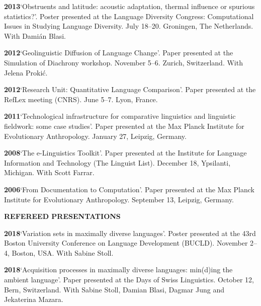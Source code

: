 \documentclass[11pt]{article}
\newcommand{\hangpara}{
 \setlength{\parindent}{0in} %
 \hangindent=0.42in %
}
\begin{document}
\vskip 6pt
\hangpara
{\bf 2013}\hspace{1ex}`Obstruents and latitude: acoustic adaptation, thermal influence or spurious statistics?'. Poster presented at the Language Diversity Congress: Computational Issues in Studying Language Diversity. July 18--20. Groningen, The Netherlands. With Dami{\'a}n Blasi.

\vskip 6pt
\hangpara
{\bf 2012}\hspace{1ex}`Geolinguistic Diffusion of Language Change'. Paper presented at the Simulation of Diachrony workshop. November 5--6. Zurich, Switzerland. With Jelena Proki{\'c}.

\vskip 6pt
\hangpara
{\bf 2012}\hspace{1ex}`Research Unit: Quantitative Language Comparison'. Paper presented at the RefLex meeting (CNRS). June 5--7. Lyon, France. 

\vskip 6pt
\hangpara
{\bf 2011}\hspace{1ex}`Technological infrastructure for comparative linguistics and linguistic fieldwork: some case studies'. Paper presented at the Max Planck Institute for Evolutionary Anthropology. January 27, Leipzig, Germany. 

\vskip 6pt
\hangpara
{\bf 2008}\hspace{1ex}`The e-Linguistics Toolkit'. Paper presented at the Institute for Language Information and Technology (The Linguist List). December 18, Ypsilanti, Michigan. With Scott Farrar.

\vskip 6pt
\hangpara
{\bf 2006}\hspace{1ex}`From Documentation to Computation'. Paper presented at the Max Planck Institute for Evolutionary Anthropology. September 13, Leipzig, Germany.


\vskip 20pt
\begin{flushleft}
{\bf REFEREED PRESENTATIONS}
\end{flushleft}

\hangpara
{\bf 2018}\hspace{1ex}`Variation sets in maximally diverse languages'. Poster presented at the 43rd Boston University Conference on Language Development (BUCLD). November 2--4, Boston, USA. With Sabine Stoll.

\hangpara
\vskip 6pt
{\bf 2018}\hspace{1ex}`Acquisition processes in maximally diverse languages: min(d)ing the ambient language'. Paper presented at the Days of Swiss Linguistics. October 12, Bern, Switzerland. With Sabine Stoll, Damian Blasi, Dagmar Jung and Jekaterina Mazara.
\end{document}
